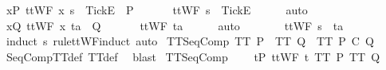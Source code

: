 \begin{isabellebody}
{\ {\isachardoublequoteopen}{\isasymforall}x{\isasymin}P{\isachardot}\ ttWF\ x{\isachardoublequoteclose}\ {\isachardoublequoteopen}s\ {\isacharat}\ {\isacharbrackleft}{\isacharbrackleft}Tick{\isacharbrackright}\isactrlsub E{\isacharbrackright}\ {\isasymin}\ P{\isachardoublequoteclose}\isanewline
\ \ \isamarkupfalse%
\ \isamarkupfalse%
\ {}{\isacharcolon}\ {\isachardoublequoteopen}ttWF\ {\isacharparenleft}s\ {\isacharat}\ {\isacharbrackleft}{\isacharbrackleft}Tick{\isacharbrackright}\isactrlsub E{\isacharbrackright}{\isacharparenright}{\isachardoublequoteclose}\isanewline
\ \ \ \ \isamarkupfalse%
\ auto\isanewline
\ \ \isamarkupfalse%
\ {\isachardoublequoteopen}{\isasymforall}x{\isasymin}Q{\isachardot}\ ttWF\ x{\isachardoublequoteclose}\ {\isachardoublequoteopen}ta\ {\isasymin}\ Q{\isachardoublequoteclose}\isanewline
\ \ \isamarkupfalse%
\ \isamarkupfalse%
\ {}{\isacharcolon}\ {\isachardoublequoteopen}ttWF\ ta{\isachardoublequoteclose}\isanewline
\ \ \ \ \isamarkupfalse%
\ auto\isanewline
\ \ \isamarkupfalse%
\ {}\ {}\ \isamarkupfalse%
\ {\isachardoublequoteopen}ttWF\ {\isacharparenleft}s\ {\isacharat}\ ta{\isacharparenright}{\isachardoublequoteclose}\isanewline
\ \ \ \ \isamarkupfalse%
\ {\isacharparenleft}induct\ s\ rule{\isacharcolon}ttWF{\isachardot}induct{\isacharcomma}\ auto{\isacharparenright}\isanewline
{}\isamarkupfalse%
%
\endisatagproof
{\isafoldproof}%
%
\isadelimproof
%
\endisadelimproof
%
}%
\isamarkupfalse%
\ TT{}{\isacharunderscore}SeqComp{\isacharcolon}\ {\isachardoublequoteopen}TT{}\ P\ {\isasymLongrightarrow}\ TT{}\ Q\ {\isasymLongrightarrow}\ TT{}\ {\isacharparenleft}P\ {\isacharsemicolon}\isactrlsub C\ Q{\isacharparenright}{\isachardoublequoteclose}\isanewline
%
\isadelimproof
\ \ %
\endisadelimproof
%
\isatagproof
{}\isamarkupfalse%
\ SeqCompTT{\isacharunderscore}def\ TT{}{\isacharunderscore}def\ \isamarkupfalse%
\ blast%
\endisatagproof
{\isafoldproof}%
%
\isadelimproof
\isanewline
%
\endisadelimproof
\isanewline
{}\isamarkupfalse%
\ TT{}{\isacharunderscore}SeqComp{\isacharcolon}\ \isanewline
\ \ \ {\isachardoublequoteopen}{\isasymforall}t{\isasymin}P{\isachardot}\ ttWF\ t{\isachardoublequoteclose}\ {\isachardoublequoteopen}TT{}\ P{\isachardoublequoteclose}\ {\isachardoublequoteopen}TT{}\ Q{\isachardoublequoteclose}\isanewline

\end{isabellebody}

